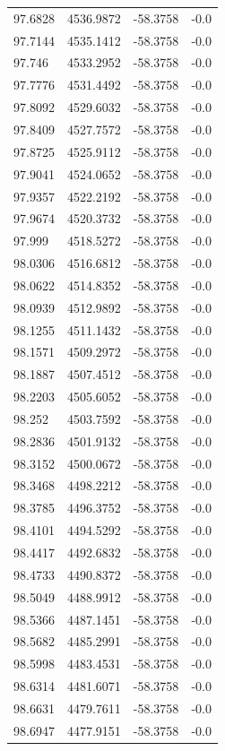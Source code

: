 \begin{table}[H]
\begin{tabular}{llll}
97.6828 & 4536.9872 & -58.3758 & -0.0 \\
97.7144 & 4535.1412 & -58.3758 & -0.0 \\
97.746 & 4533.2952 & -58.3758 & -0.0 \\
97.7776 & 4531.4492 & -58.3758 & -0.0 \\
97.8092 & 4529.6032 & -58.3758 & -0.0 \\
97.8409 & 4527.7572 & -58.3758 & -0.0 \\
97.8725 & 4525.9112 & -58.3758 & -0.0 \\
97.9041 & 4524.0652 & -58.3758 & -0.0 \\
97.9357 & 4522.2192 & -58.3758 & -0.0 \\
97.9674 & 4520.3732 & -58.3758 & -0.0 \\
97.999 & 4518.5272 & -58.3758 & -0.0 \\
98.0306 & 4516.6812 & -58.3758 & -0.0 \\
98.0622 & 4514.8352 & -58.3758 & -0.0 \\
98.0939 & 4512.9892 & -58.3758 & -0.0 \\
98.1255 & 4511.1432 & -58.3758 & -0.0 \\
98.1571 & 4509.2972 & -58.3758 & -0.0 \\
98.1887 & 4507.4512 & -58.3758 & -0.0 \\
98.2203 & 4505.6052 & -58.3758 & -0.0 \\
98.252 & 4503.7592 & -58.3758 & -0.0 \\
98.2836 & 4501.9132 & -58.3758 & -0.0 \\
98.3152 & 4500.0672 & -58.3758 & -0.0 \\
98.3468 & 4498.2212 & -58.3758 & -0.0 \\
98.3785 & 4496.3752 & -58.3758 & -0.0 \\
98.4101 & 4494.5292 & -58.3758 & -0.0 \\
98.4417 & 4492.6832 & -58.3758 & -0.0 \\
98.4733 & 4490.8372 & -58.3758 & -0.0 \\
98.5049 & 4488.9912 & -58.3758 & -0.0 \\
98.5366 & 4487.1451 & -58.3758 & -0.0 \\
98.5682 & 4485.2991 & -58.3758 & -0.0 \\
98.5998 & 4483.4531 & -58.3758 & -0.0 \\
98.6314 & 4481.6071 & -58.3758 & -0.0 \\
98.6631 & 4479.7611 & -58.3758 & -0.0 \\
98.6947 & 4477.9151 & -58.3758 & -0.0 \\

\end{tabular}
\end{table}
